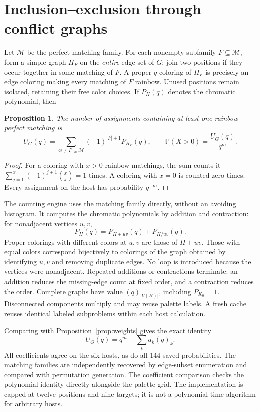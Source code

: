 \documentclass[10pt,letterpaper]{article}
\newtheorem{proposition}{Proposition}
\newcommand{\Prob}{\mathbb P}
\begin{document}
\section{Inclusion--exclusion through conflict graphs}
Let $\mathcal M$ be the perfect-matching family. For each nonempty subfamily
$F\subseteq\mathcal M$, form a simple graph $H_F$ on the \emph{entire} edge
set of $G$: join two positions if they occur together in some matching of $F$.
A proper $q$-coloring of $H_F$ is precisely an edge coloring making every
matching of $F$ rainbow. Unused positions remain isolated, retaining their
free color choices. If $P_H(q)$ denotes the chromatic polynomial, then
\begin{proposition}\label{prop:ie}
The number of assignments containing at least one rainbow perfect matching is
\[
 U_G(q)=\sum_{\varnothing\ne F\subseteq\mathcal M}
 (-1)^{|F|+1}P_{H_F}(q),\qquad \Prob(X>0)=\frac{U_G(q)}{q^m}.
\]
\end{proposition}
\begin{proof}
For a coloring with $x>0$ rainbow matchings, the sum counts it
$\sum_{j=1}^{x}(-1)^{j+1}\binom{x}{j}=1$ times. A coloring with $x=0$
is counted zero times. Every assignment on the host has probability $q^{-m}$.
\end{proof}
The counting engine uses the matching family directly, without an avoiding
histogram. It computes the chromatic polynomials by addition and contraction:
for nonadjacent vertices $u,v$,
\[
 P_H(q)=P_{H+uv}(q)+P_{H/uv}(q).
\]
Proper colorings with different colors at $u,v$ are those of $H+uv$.
Those with equal colors correspond bijectively to colorings of the graph
obtained by identifying $u,v$ and removing duplicate edges. No loop is
introduced because the vertices were nonadjacent. Repeated additions or
contractions terminate: an addition reduces the missing-edge count at fixed
order, and a contraction reduces the order. Complete graphs have value
$(q)_{|V(H)|}$, including $P_{K_0}=1$. Disconnected components multiply and
may reuse palette labels. A fresh cache reuses identical labeled subproblems
within each host calculation.

Comparing with Proposition~\ref{prop:weights} gives the exact identity
\[
 U_G(q)=q^m-\sum_k a_k(q)_k.
\]
All coefficients agree on the six hosts, as do all 144 saved probabilities.
The matching families are independently recovered by edge-subset enumeration
and compared with permutation generation. The coefficient comparison checks
the polynomial identity directly alongside the palette grid. The implementation
is capped at twelve positions and nine targets; it is not a polynomial-time
algorithm for arbitrary hosts.
\end{document}

